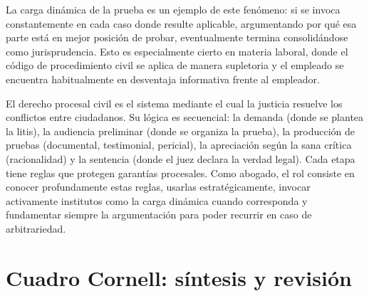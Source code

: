 \documentclass[12pt,oneside]{book}
\begin{document}
La carga dinámica de la prueba es un ejemplo de este fenómeno: si se invoca constantemente en cada caso donde resulte aplicable, argumentando por qué esa parte está en mejor posición de probar, eventualmente termina consolidándose como jurisprudencia. Esto es especialmente cierto en materia laboral, donde el código de procedimiento civil se aplica de manera supletoria y el empleado se encuentra habitualmente en desventaja informativa frente al empleador.

El derecho procesal civil es el sistema mediante el cual la justicia resuelve los conflictos entre ciudadanos. Su lógica es secuencial: la demanda (donde se plantea la litis), la audiencia preliminar (donde se organiza la prueba), la producción de pruebas (documental, testimonial, pericial), la apreciación según la sana crítica (racionalidad) y la sentencia (donde el juez declara la verdad legal). Cada etapa tiene reglas que protegen garantías procesales. Como abogado, el rol consiste en conocer profundamente estas reglas, usarlas estratégicamente, invocar activamente institutos como la carga dinámica cuando corresponda y fundamentar siempre la argumentación para poder recurrir en caso de arbitrariedad.

\section*{Cuadro Cornell: síntesis y revisión}
\end{document}
